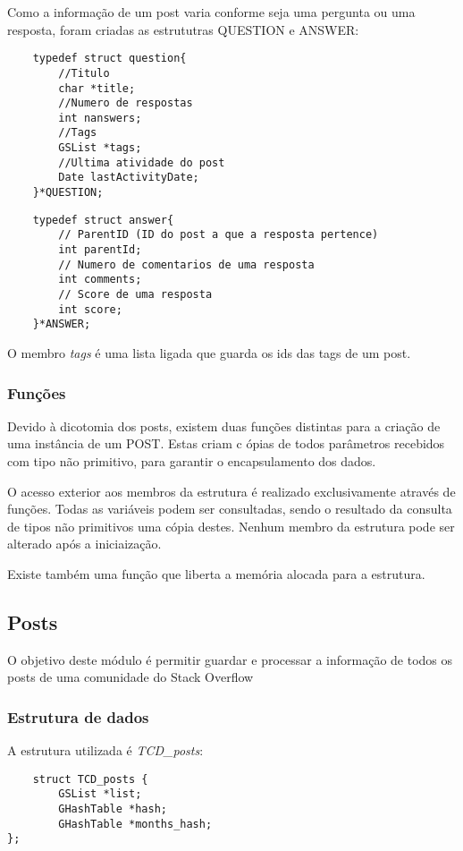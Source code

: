 \documentclass[10pt]{article}
\begin{document}
	Como a informação de um post varia conforme seja uma pergunta ou uma resposta, foram criadas as estrututras QUESTION e ANSWER:
\begin{lstlisting}
	typedef struct question{
		//Titulo
		char *title;
		//Numero de respostas 
		int nanswers;
		//Tags 
		GSList *tags;
		//Ultima atividade do post 
		Date lastActivityDate;
	}*QUESTION;
	\end{lstlisting}
	\begin{lstlisting}
	typedef struct answer{
		// ParentID (ID do post a que a resposta pertence) 
		int parentId;
		// Numero de comentarios de uma resposta 
		int comments;
		// Score de uma resposta 
		int score;
	}*ANSWER;
	\end{lstlisting}

	O membro \emph{tags} é uma lista ligada que guarda os ids das tags de um post.

\subsubsection{Funções}

	Devido à dicotomia dos posts, existem duas funções distintas para a criação de uma instância de um POST. Estas criam c
	ópias de todos parâmetros recebidos com tipo não primitivo, para garantir o encapsulamento dos dados.

	O acesso exterior aos membros da estrutura é realizado exclusivamente através de funções. Todas as variáveis podem ser consultadas, sendo o resultado da consulta de tipos não primitivos uma cópia destes. Nenhum membro da estrutura pode ser alterado após a iniciaização.

	Existe também uma função que liberta a memória alocada para a estrutura.

\subsection{Posts}
	O objetivo deste módulo é permitir guardar e processar a informação de todos os posts de uma comunidade do Stack Overflow
\subsubsection{Estrutura de dados}

	A estrutura utilizada é \emph{TCD\_posts}:
	\begin{lstlisting}
	struct TCD_posts {
		GSList *list;
		GHashTable *hash;
		GHashTable *months_hash; 
};
	\end{lstlisting}
\end{document}
